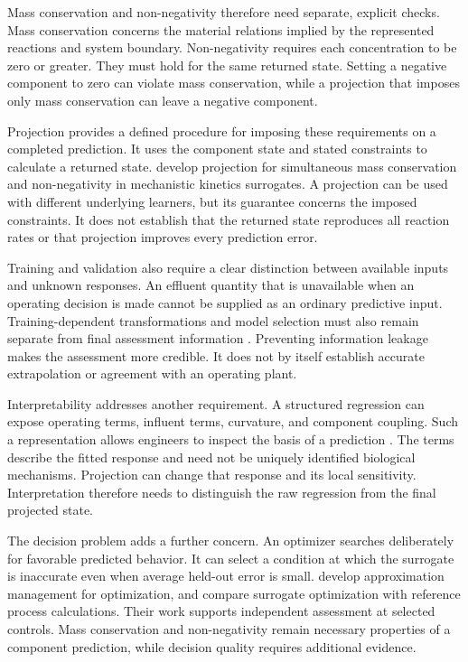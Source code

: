 Mass conservation and non-negativity therefore need separate, explicit checks. Mass conservation concerns the material relations implied by the represented reactions and system boundary. Non-negativity requires each concentration to be zero or greater. They must hold for the same returned state. Setting a negative component to zero can violate mass conservation, while a projection that imposes only mass conservation can leave a negative component.

Projection provides a defined procedure for imposing these requirements on a completed prediction. It uses the component state and stated constraints to calculate a returned state. \citet{KircherVotsmeier2025} develop projection for simultaneous mass conservation and non-negativity in mechanistic kinetics surrogates. A projection can be used with different underlying learners, but its guarantee concerns the imposed constraints. It does not establish that the returned state reproduces all reaction rates or that projection improves every prediction error.

Training and validation also require a clear distinction between available inputs and unknown responses. An effluent quantity that is unavailable when an operating decision is made cannot be supplied as an ordinary predictive input. Training-dependent transformations and model selection must also remain separate from final assessment information \citep{Kaufman2012,Newhart2019}. Preventing information leakage makes the assessment more credible. It does not by itself establish accurate extrapolation or agreement with an operating plant.

Interpretability addresses another requirement. A structured regression can expose operating terms, influent terms, curvature, and component coupling. Such a representation allows engineers to inspect the basis of a prediction \citep{Rudin2019,Brunton2016}. The terms describe the fitted response and need not be uniquely identified biological mechanisms. Projection can change that response and its local sensitivity. Interpretation therefore needs to distinguish the raw regression from the final projected state.

The decision problem adds a further concern. An optimizer searches deliberately for favorable predicted behavior. It can select a condition at which the surrogate is inaccurate even when average held-out error is small. \citet{Alexandrov1998} develop approximation management for optimization, and \citet{Pedrozo2025} compare surrogate optimization with reference process calculations. Their work supports independent assessment at selected controls. Mass conservation and non-negativity remain necessary properties of a component prediction, while decision quality requires additional evidence.

